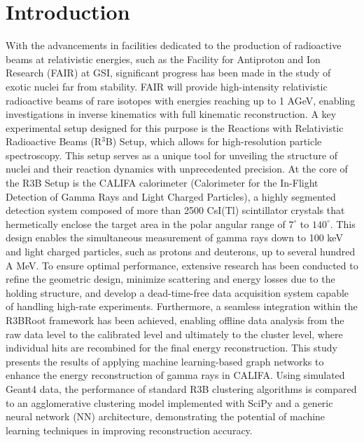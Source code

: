 \documentclass[final,5p,times,twocolumn]{elsarticle}
\begin{document}



\section{Introduction}
\label{sec:intro}
With the advancements in facilities dedicated to the production of radioactive beams at relativistic energies, such as the Facility for Antiproton and Ion Research (FAIR) at GSI, significant progress has been made in the study of exotic nuclei far from stability\cite{kalantar2024experiments}. FAIR will provide high-intensity relativistic radioactive beams of rare isotopes with energies reaching up to 1 AGeV, enabling investigations in inverse kinematics with full kinematic reconstruction\cite{leifels2025status}.
A key experimental setup designed for this purpose is the Reactions with Relativistic Radioactive Beams (R$^3$B) Setup, which allows for high-resolution particle spectroscopy. This setup serves as a unique tool for unveiling the structure of nuclei and their reaction dynamics with unprecedented precision.\newline
At the core of the R3B Setup is the CALIFA calorimeter (Calorimeter for the In-Flight Detection of Gamma Rays and Light Charged Particles), a highly segmented detection system composed of more than 2500 CsI(Tl) scintillator crystals that hermetically enclose the target area in the polar angular range of $7^\circ$ to $140^\circ$. This design enables the simultaneous measurement of gamma rays down to 100 keV and light charged particles, such as protons and deuterons, up to several hundred A MeV\cite{cortina2014califa}. To ensure optimal performance, extensive research has been conducted to refine the geometric design, minimize scattering and energy losses due to the holding structure\cite{alvarez2014performance}, and develop a dead-time-free data acquisition system capable of handling high-rate experiments\cite{ledigital}. Furthermore, a seamless integration within the R3BRoot framework\cite{bertini2011r3broot} has been achieved, enabling offline data analysis from the raw data level to the calibrated level and ultimately to the cluster level, where individual hits are recombined for the final energy reconstruction.\newline
This study presents the results of applying machine learning-based graph networks to enhance the energy reconstruction of gamma rays in CALIFA. Using simulated Geant4 data, the performance of standard R3B clustering algorithms is compared to an agglomerative clustering model implemented with SciPy\cite{virtanen2020scipy} and a generic neural network (NN) architecture, demonstrating the potential of machine learning techniques in improving reconstruction accuracy.\newline
\end{document}
